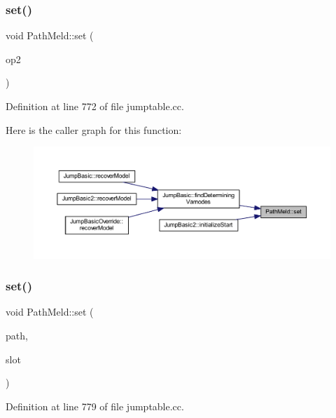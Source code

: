 \subsubsection{\texorpdfstring{set()}{set()}\hspace{0.1cm}{\footnotesize\ttfamily [1/3]}}
{\footnotesize\ttfamily void Path\+Meld\+::set (\begin{DoxyParamCaption}\item[{const \mbox{\hyperlink{class_path_meld}{Path\+Meld}} \&}]{op2 }\end{DoxyParamCaption})}



Definition at line 772 of file jumptable.\+cc.

Here is the caller graph for this function\+:
\nopagebreak
\begin{figure}[H]
\begin{center}
\leavevmode
\includegraphics[width=350pt]{class_path_meld_a665ffb4a63f3c682f3b7a945069be46b_icgraph}
\end{center}
\end{figure}
\mbox{\label{class_path_meld_a38b8ca6475525a777370f9ef2a14b283}} 
\subsubsection{\texorpdfstring{set()}{set()}\hspace{0.1cm}{\footnotesize\ttfamily [2/3]}}
{\footnotesize\ttfamily void Path\+Meld\+::set (\begin{DoxyParamCaption}\item[{const vector$<$ \mbox{\hyperlink{class_pcode_op}{Pcode\+Op}} $\ast$ $>$ \&}]{path,  }\item[{const vector$<$ int4 $>$ \&}]{slot }\end{DoxyParamCaption})}



Definition at line 779 of file jumptable.\+cc.

